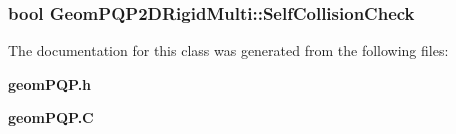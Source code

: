 \subsubsection{\setlength{\rightskip}{0pt plus 5cm}bool Geom\-PQP2DRigid\-Multi::Self\-Collision\-Check}\label{classGeomPQP2DRigidMulti_m0}




The documentation for this class was generated from the following files:\begin{CompactItemize}
\item 
{\bf geom\-PQP.h}\item 
{\bf geom\-PQP.C}\end{CompactItemize}
